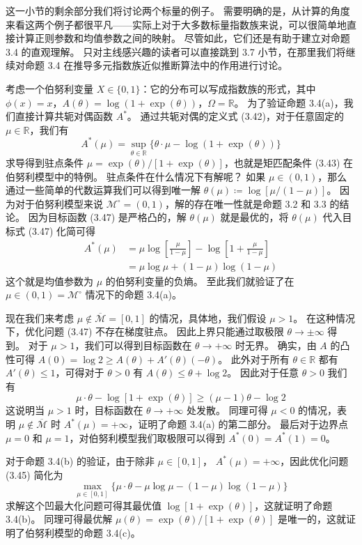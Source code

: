 这一小节的剩余部分我们将讨论两个标量的例子。
需要明确的是，从计算的角度来看这两个例子都很平凡——实际上对于大多数标量指数族来说，可以很简单地直接计算正则参数和均值参数之间的映射。
尽管如此，它们还是有助于建立对命题 3.4 的直观理解。
只对主线感兴趣的读者可以直接跳到 3.7 小节，在那里我们将继续对命题 3.4 在推导多元指数族近似推断算法中的作用进行讨论。

\begin{tcolorbox}
\begin{exam}[伯努利模型的共轭对偶性]
    
考虑一个伯努利变量 $X \in \{0, 1\}$：它的分布可以写成指数族的形式，其中 $\phi(x) = x$，$A(\theta) = \log(1+\exp(\theta))$，$\Omega = \mathbb{R}$。
为了验证命题 3.4(a)，我们直接计算共轭对偶函数 $A^*$。
通过共轭对偶的定义式 (3.42)，对于任意固定的 $\mu \in \mathbb{R}$，我们有
\begin{equation}
    A^*(\mu) = \sup_{\theta \in \mathbb{R}}\{\theta\cdot\mu - \log(1+\exp(\theta))\}
\end{equation}
求导得到驻点条件 $\mu = \exp(\theta)/[1+\exp(\theta)]$，也就是矩匹配条件 (3.43) 在伯努利模型中的特例。
驻点条件在什么情况下有解呢？
如果 $\mu \in (0, 1)$，那么通过一些简单的代数运算我们可以得到唯一解 $\theta(\mu) \coloneqq \log[\mu/(1-\mu)]$。
因为对于伯努利模型来说 $\mathcal{M}^\circ = (0, 1)$，解的存在唯一性就是命题 3.2 和 3.3 的结论。
因为目标函数 (3.47) 是严格凸的，解 $\theta(\mu)$ 就是最优的，将 $\theta(\mu)$ 代入目标式 (3.47) 化简可得
\begin{align*}
    A^*(\mu) &= \mu\log[\frac{\mu}{1-\mu}] - \log[1+\frac{\mu}{1-\mu}] \\
    &= \mu\log\mu + (1-\mu)\log(1-\mu)
\end{align*}
这个就是均值参数为 $\mu$ 的伯努利变量的负熵。
至此我们就验证了在 $\mu \in (0, 1) = \mathcal{M}^\circ$ 情况下的命题 3.4(a)。

现在我们来考虑 $\mu \notin \overline{\mathcal{M}} = [0, 1]$ 的情况，具体地，我们假设 $\mu > 1$。
在这种情况下，优化问题 (3.47) 不存在梯度驻点。
因此上界只能通过取极限 $\theta \to \pm\infty$ 得到。
对于 $\mu > 1$，我们可以得到目标函数在 $\theta \to +\infty$ 时无界。
确实，由 $A$ 的凸性可得 $A(0) = \log 2 \geq A(\theta) + A'(\theta)(-\theta)$。
此外对于所有 $\theta \in \mathbb{R}$ 都有 $A'(\theta) \leq 1$，可得对于 $\theta > 0$ 有 $A(\theta) \leq \theta + \log 2$。
因此对于任意 $\theta > 0$ 我们有
$$\mu\cdot\theta - \log[1+\exp(\theta)] \geq (\mu-1)\theta - \log 2$$
这说明当 $\mu > 1$ 时，目标函数在 $\theta \to +\infty$ 处发散。
同理可得 $\mu < 0$ 的情况，表明 $\mu \notin \overline{\mathcal{M}}$ 时 $A^*(\mu) = +\infty$，证明了命题 3.4(a) 的第二部分。
最后对于边界点 $\mu = 0$ 和 $\mu = 1$，对伯努利模型我们取极限可以得到 $A^*(0) = A^*(1) = 0$。

对于命题 3.4(b) 的验证，由于除非 $\mu \in [0, 1]$， $A^*(\mu) = +\infty$，因此优化问题 (3.45) 简化为
$$\max_{\mu \in [0, 1]}\{\mu\cdot\theta - \mu\log\mu - (1-\mu)\log(1-\mu)\}$$
求解这个凹最大化问题可得其最优值 $\log[1+\exp(\theta)]$，这就证明了命题 3.4(b)。
同理可得最优解 $\mu(\theta) = \exp(\theta)/[1+\exp(\theta)]$ 是唯一的，这就证明了伯努利模型的命题 3.4(c)。

\end{exam}
\end{tcolorbox}

